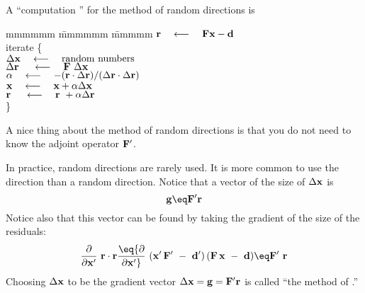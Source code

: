 \par
A ``computation '' for the method of random directions is
\def\padarrow{\quad\longleftarrow\quad}
\label{lsq/'randtemplate'}
\begin{tabbing}
mmmmmm \= mmmmmm \= mmmmm \kill
\> $\bold r \padarrow \bold F \bold x - \bold d$ \\
\> {\rm iterate \{ }                                                    \\
\>      \>  $\Delta \bold x   \padarrow {\rm random\ numbers}$          \\
\>      \>  $\Delta \bold r\  \padarrow \bold F \  \Delta \bold x$      \\
\>      \> $\alpha \padarrow
                -(       \bold r \cdot \Delta\bold r )/
                 (\Delta \bold r \cdot \Delta\bold r )
                $
                \\
\>      \> $\bold x   \padarrow \bold x   + \alpha\Delta \bold x$       \\
\>      \> $\bold r\  \padarrow \bold r\  + \alpha\Delta \bold r$       \\
\>      \> \}                                                   
\end{tabbing}
A nice thing about the method of random directions is that you
do not need to know the adjoint operator $\bold F'$.

\par
In practice, random directions are rarely used.
It is more common to use the  direction than a random direction.
Notice that a vector of the size of $\Delta \bold x$ is
\begin{equation}
\bold g \eq  \bold F' \bold r
\end{equation}
Notice also that this vector can be found by taking the gradient
of the size of the residuals:
\begin{equation}
{\partial \over  \partial \bold x' }  \ \bold r \cdot \bold r
\eq
{\partial \over  \partial \bold x' }  \ 
( \bold x' \, \bold F'  \ -\  \bold d') \,
( \bold F  \, \bold x   \ -\  \bold d)
\eq
\bold F' \  \bold r
\end{equation}
Choosing $\Delta \bold x$ to be the gradient vector
$\Delta\bold x = \bold g = \bold F' \bold r$
is called ``the method of .''

